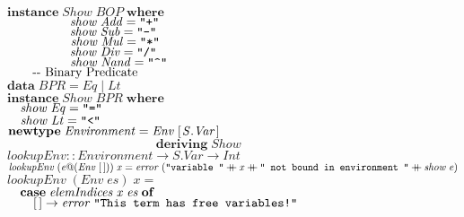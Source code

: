 \documentclass[10pt]{article}
\newcommand{\Conid}[1]{\mathit{#1}}
\newcommand{\Varid}[1]{\mathit{#1}}
\newcommand{\plus}{\mathbin{+\!\!\!+}}
\begin{document}
\begin{hscode}
${}$\\
${\mathbf{instance}\;\Conid{Show}\;\Conid{BOP}\;\mathbf{where}}$\\
${\hskip5.00em\relax\Varid{show}\;\Conid{Add}\mathrel{=}\text{\tt \char34 +\char34}}$\\
${\hskip5.00em\relax\Varid{show}\;\Conid{Sub}\mathrel{=}\text{\tt \char34 -\char34}}$\\
${\hskip5.00em\relax\Varid{show}\;\Conid{Mul}\mathrel{=}\text{\tt \char34 *\char34}}$\\
${\hskip5.00em\relax\Varid{show}\;\Conid{Div}\mathrel{=}\text{\tt \char34 /\char34}}$\\
${\hskip5.00em\relax\Varid{show}\;\Conid{Nand}\mathrel{=}\text{\tt \char34 \char94 \char34}}$\\
${}$\\
${\mbox{\qquad-{}-  Binary Predicate}}$\\
${\mathbf{data}\;\Conid{BPR}\mathrel{=}\Conid{Eq}\mid \Conid{Lt}}$\\
${\mathbf{instance}\;\Conid{Show}\;\Conid{BPR}\;\mathbf{where}}$\\
${\hskip1.00em\relax\Varid{show}\;\Conid{Eq}\mathrel{=}\text{\tt \char34 =\char34}}$\\
${\hskip1.00em\relax\Varid{show}\;\Conid{Lt}\mathrel{=}\text{\tt \char34 <\char34}}$\\
${}$\\
${\mathbf{newtype}\;\Conid{Environment}\mathrel{=}\Conid{Env}\;[\mskip1.5mu \Conid{\Conid{S}.Var}\mskip1.5mu]}$\\
${\phantom{\mathbf{newtype}\;\Conid{Environment}\mathrel{=}\mbox{}}\mathbf{deriving}\;\Conid{Show}}$\\
${}$\\
${\Varid{lookupEnv}\mathbin{::}\Conid{Environment}\to \Conid{\Conid{S}.Var}\to \Conid{Int}}$\\
${\Varid{lookupEnv}\;(\Varid{e}\mathord{@}(\Conid{Env}\;[\mskip1.5mu \mskip1.5mu]))\;\Varid{x}\mathrel{=}\Varid{error}\;(\text{\tt \char34 variable~\char34}\plus \Varid{x}\plus \text{\tt \char34 ~not~bound~in~environment~\char34}\plus \Varid{show}\;\Varid{e})}$\\
${\Varid{lookupEnv}\;(\Conid{Env}\;\Varid{es})\;\Varid{x}\mathrel{=}}$\\
${\hskip1.00em\relax\mathbf{case}\;\Varid{elemIndices}\;\Varid{x}\;\Varid{es}\;\mathbf{of}}$\\
${\hskip1.00em\relax\hskip1.00em\relax[\mskip1.5mu \mskip1.5mu]\to \Varid{error}\;\text{\tt \char34 This~term~has~free~variables!\char34}}$\\

\end{hscode}
\end{document}
